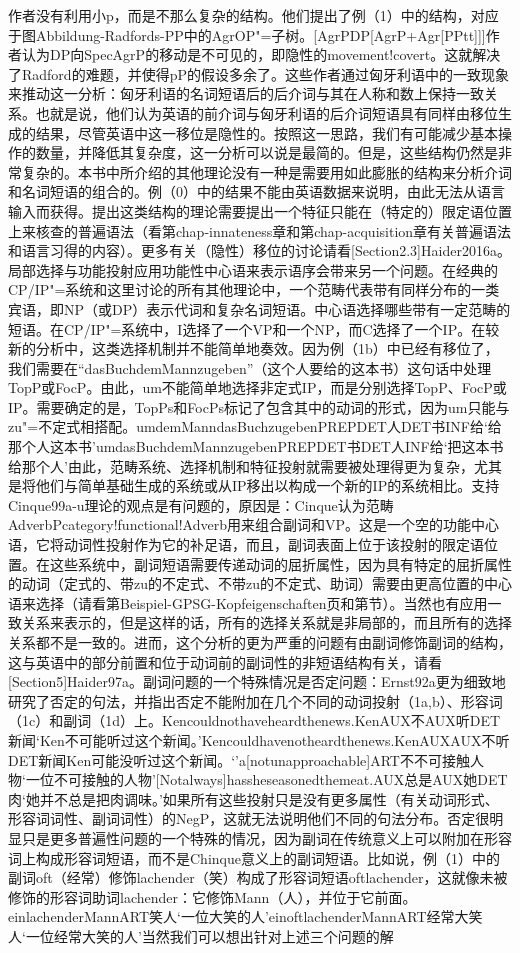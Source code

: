 作者没有利用小p，而是不那么复杂的结构。他们提出了例（1）中的结构，对应于图Abbildung-Radfords-PP中的AgrOP"=子树。[AgrPDP[AgrP+Agr[PPtt]]]作者认为DP向SpecAgrP的移动是不可见的，即隐性的movement!covert。这就解决了Radford的难题，并使得pP的假设多余了。这些作者通过匈牙利语中的一致现象来推动这一分析：匈牙利语的名词短语后的后介词与其在人称和数上保持一致关系。也就是说，他们认为英语的前介词与匈牙利语的后介词短语具有同样由移位生成的结果，尽管英语中这一移位是隐性的。按照这一思路，我们有可能减少基本操作的数量，并降低其复杂度，这一分析可以说是最简的。但是，这些结构仍然是非常复杂的。本书中所介绍的其他理论没有一种是需要用如此膨胀的结构来分析介词和名词短语的组合的。例（0）中的结果不能由英语数据来说明，由此无法从语言输入而获得。提出这类结构的理论需要提出一个特征只能在（特定的）限定语位置上来核查的普遍语法（看第chap-innateness章和第chap-acquisition章有关普遍语法和语言习得的内容）。更多有关（隐性）移位的讨论请看[Section2.3]Haider2016a。局部选择与功能投射应用功能性中心语来表示语序会带来另一个问题。在经典的CP/IP"=系统和这里讨论的所有其他理论中，一个范畴代表带有同样分布的一类宾语，即NP（或DP）表示代词和复杂名词短语。中心语选择哪些带有一定范畴的短语。在CP/IP"=系统中，I选择了一个VP和一个NP，而C选择了一个IP。在较新的分析中，这类选择机制并不能简单地奏效。因为例（1b）中已经有移位了，我们需要在“dasBuchdemMannzugeben”（这个人要给的这本书）这句话中处理TopP或FocP。由此，um不能简单地选择非定式IP，而是分别选择TopP、FocP或IP。需要确定的是，TopPs和FocPs标记了包含其中的动词的形式，因为um只能与zu"=不定式相搭配。umdemManndasBuchzugebenPREPDET人DET书INF给`给那个人这本书'umdasBuchdemMannzugebenPREPDET书DET人INF给`把这本书给那个人'由此，范畴系统、选择机制和特征投射就需要被处理得更为复杂，尤其是将他们与简单基础生成的系统或从IP移出以构成一个新的IP的系统相比。支持Cinque99a-u理论的观点是有问题的，原因是：Cinque认为范畴AdverbPcategory!functional!Adverb用来组合副词和VP。这是一个空的功能中心语，它将动词性投射作为它的补足语，而且，副词表面上位于该投射的限定语位置。在这些系统中，副词短语需要传递动词的屈折属性，因为具有特定的屈折属性的动词（定式的、带zu的不定式、不带zu的不定式、助词）需要由更高位置的中心语来选择（请看第Beispiel-GPSG-Kopfeigenschaften页和第节）。当然也有应用一致关系来表示的，但是这样的话，所有的选择关系就是非局部的，而且所有的选择关系都不是一致的。进而，这个分析的更为严重的问题有由副词修饰副词的结构，这与英语中的部分前置和位于动词前的副词性的非短语结构有关，请看[Section5]Haider97a。副词问题的一个特殊情况是否定问题：Ernst92a更为细致地研究了否定的句法，并指出否定不能附加在几个不同的动词投射（1a,b）、形容词（1c）和副词（1d）上。Kencouldnothaveheardthenews.KenAUX不AUX听DET新闻`Ken不可能听过这个新闻。'Kencouldhavenotheardthenews.KenAUXAUX不听DET新闻Ken可能没听过这个新闻。`'a[notunapproachable]ART不不可接触人物`一位不可接触的人物'[Notalways]hassheseasonedthemeat.AUX总是AUX她DET肉`她并不总是把肉调味。'如果所有这些投射只是没有更多属性（有关动词形式、形容词词性、副词词性）的NegP，这就无法说明他们不同的句法分布。否定很明显只是更多普遍性问题的一个特殊的情况，因为副词在传统意义上可以附加在形容词上构成形容词短语，而不是Chinque意义上的副词短语。比如说，例（1）中的副词oft（经常）修饰lachender（笑）构成了形容词短语oftlachender，这就像未被修饰的形容词助词lachender：它修饰Mann（人），并位于它前面。einlachenderMannART笑人`一位大笑的人'einoftlachenderMannART经常大笑人`一位经常大笑的人'当然我们可以想出针对上述三个问题的解